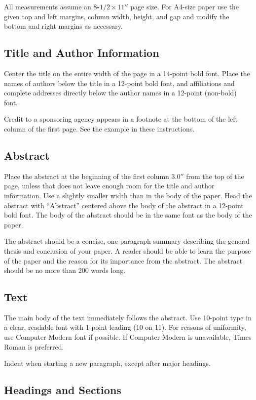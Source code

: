\documentclass{article}
\begin{document}
All measurements assume an {\bf $8$-$1/2 \times 11''$} page size.  
For A4-size paper use the given top and left margins, column width,
height, and gap and modify the bottom and right margins as necessary.

\subsection{Title and Author Information}

Center the title on the entire width of the page in a 14-point bold font.
Place the names of authors below the title in a 12-point bold font, and
affiliations and complete addresses directly below the author names in a
12-point (non-bold) font.

Credit to a sponsoring agency appears in a footnote at the bottom of the
left column of the first page.  See the example in these instructions.

\subsection{Abstract}

Place the abstract at the beginning of the first column $3.0''$ from the
top of the page, unless that does not leave enough room for the title and
author information.  Use a slightly smaller width than in the body of the
paper.  Head the abstract with ``Abstract'' centered above the body of the
abstract in a 12-point bold font.  The body of the abstract should be in
the same font as the body of the paper.

The abstract should be a concise, one-paragraph summary
describing the general thesis and conclusion of your
paper. A reader should be able to learn the purpose of the
paper and the reason for its importance from the abstract. The
abstract should be no more than 200 words long.

\subsection{Text}

The main body of the text immediately follows the abstract. 
Use 10-point type in a clear, readable font with 1-point leading (10 on
11).  For reasons of uniformity, use Computer Modern font if possible.  If
Computer Modern is unavailable, Times Roman is preferred.

Indent when starting a new paragraph, except after major headings.

\subsection{Headings and Sections}
\end{document}
